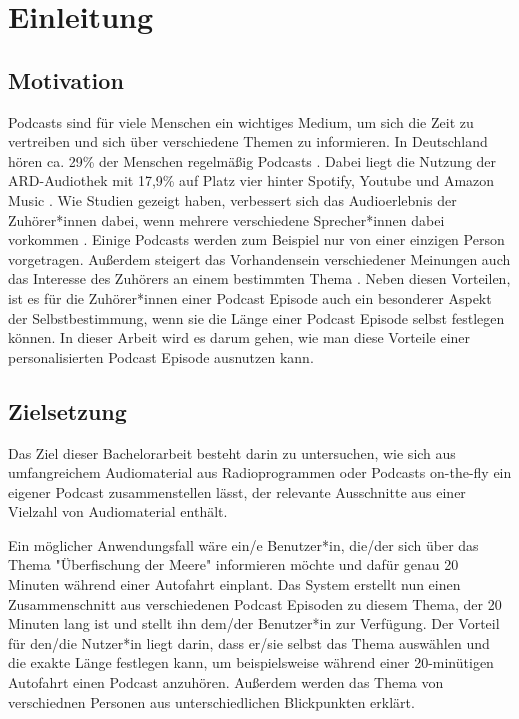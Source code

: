 \chapter{Einleitung}\label{ch:intro}

\section{Motivation}

Podcasts sind für viele Menschen ein wichtiges Medium, um sich die Zeit zu vertreiben und sich über verschiedene Themen zu informieren. 
In Deutschland hören ca. 29\% der Menschen regelmäßig Podcasts \cite{newman2022}.
Dabei liegt die Nutzung der ARD-Audiothek mit 17,9\% auf Platz vier hinter Spotify, Youtube und Amazon Music \cite{mindline-media2023}.
Wie Studien gezeigt haben, verbessert sich das Audioerlebnis der Zuhörer*innen dabei, wenn mehrere verschiedene Sprecher*innen dabei vorkommen \cite{kang2012}. 
Einige Podcasts werden zum Beispiel nur von einer einzigen Person vorgetragen.
Außerdem steigert das Vorhandensein verschiedener Meinungen auch das Interesse des Zuhörers an einem bestimmten Thema \cite{phillips2014}.
Neben diesen Vorteilen, ist es für die Zuhörer*innen einer Podcast Episode auch ein besonderer Aspekt der Selbstbestimmung, wenn sie die Länge einer Podcast Episode selbst festlegen können.
In dieser Arbeit wird es darum gehen, wie man diese Vorteile einer personalisierten Podcast Episode ausnutzen kann.


\section{Zielsetzung}


Das Ziel dieser Bachelorarbeit besteht darin zu untersuchen, wie sich aus umfangreichem Audiomaterial aus Radioprogrammen oder Podcasts on-the-fly ein eigener Podcast zusammenstellen lässt, der relevante Ausschnitte aus einer Vielzahl von Audiomaterial enthält.

Ein möglicher Anwendungsfall wäre ein/e Benutzer*in, die/der sich über das Thema "Überfischung der Meere" informieren möchte und dafür genau 20 Minuten während einer Autofahrt einplant. 
Das System erstellt nun einen Zusammenschnitt aus verschiedenen Podcast Episoden zu diesem Thema, der 20 Minuten lang ist und stellt ihn dem/der Benutzer*in zur Verfügung. 
Der Vorteil für den/die Nutzer*in liegt darin, dass er/sie selbst das Thema auswählen und die exakte Länge festlegen kann, um beispielsweise während einer 20-minütigen Autofahrt einen Podcast anzuhören. 
Außerdem werden das Thema von verschiednen Personen aus unterschiedlichen Blickpunkten erklärt. 

